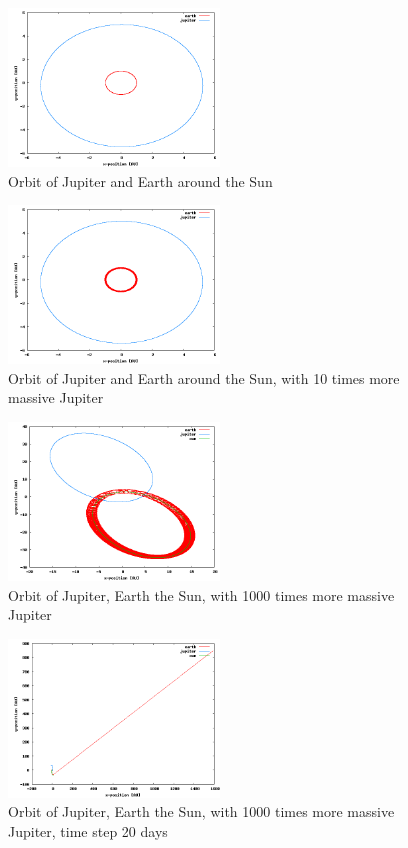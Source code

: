 \documentclass[a4wide,12pt]{article}
\begin{document}
\begin{figure}[p]
 \includegraphics[width=0.5\textwidth]{jordjup}
 \caption{Orbit of Jupiter and Earth around the Sun}
 \label{fig:13} 
\end{figure}
\begin{figure}[p]
 \includegraphics[width=0.5\textwidth]{jordjup10}
 \caption{Orbit of Jupiter and Earth around the Sun, with 10 times more massive Jupiter}
 \label{fig:14} 
\end{figure}
\begin{figure}[p]
 \includegraphics[width=0.5\textwidth]{jordjupsol1000}
 \caption{Orbit of Jupiter, Earth the Sun, with 1000 times more massive Jupiter}
 \label{fig:15} 
\end{figure}
\begin{figure}[p]
 \includegraphics[width=0.5\textwidth]{jordjupsol1000dt202}
 \caption{Orbit of Jupiter, Earth the Sun, with 1000 times more massive Jupiter, time step 20 days}
 \label{fig:16} 
\end{figure}
\end{document}
